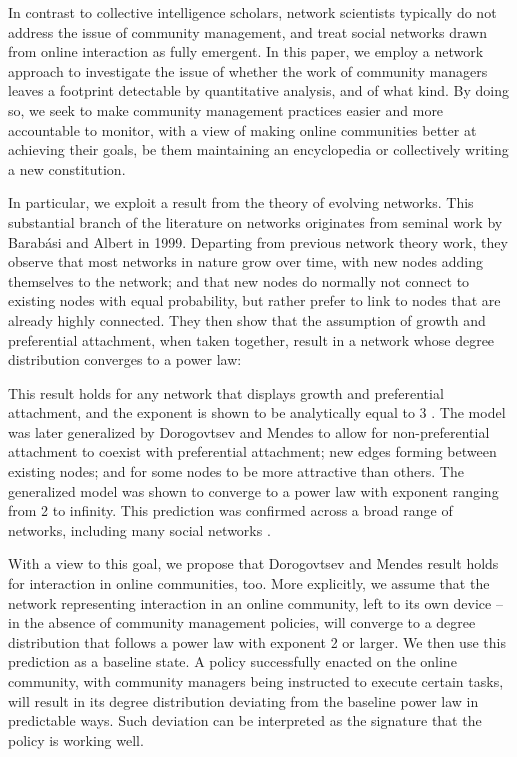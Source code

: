 In contrast to collective intelligence scholars, network scientists typically do not address the issue of community management, and treat social networks drawn from online interaction as fully emergent. In this paper, we employ a network approach to investigate the issue of whether the work of community managers leaves a footprint detectable by quantitative analysis, and of what kind. By doing so, we seek to make community management practices easier and more accountable to monitor, with a view of making online communities better at achieving their goals, be them maintaining an encyclopedia or collectively writing a new constitution. 

In particular, we exploit a result from the theory of evolving networks. This substantial branch of the literature on networks originates from seminal work by Barabási and Albert \cite{barabasi1999emergence} in 1999. Departing from previous network theory work, they observe that most networks in nature grow over time, with new nodes adding themselves to the network; and that new nodes do normally not connect to existing nodes with equal probability, but rather prefer to link to nodes that are already highly connected. They then show that the assumption of growth and preferential attachment, when taken together, result in a network whose degree distribution converges to a power law: 

This result holds for any network that displays growth and preferential attachment, and the exponent is shown to be analytically equal to 3 \cite{barabasi2005origin, barabasi1999mean}.  The model was later generalized by Dorogovtsev and Mendes to allow for non-preferential attachment to coexist with preferential attachment; new edges forming between existing nodes; and for some nodes to be more attractive than others. The generalized model was shown to converge to a power law with exponent ranging from 2 to infinity. This prediction was confirmed across a broad range of networks, including many social networks \cite{dorogovtsev2002evolution}.

With a view to this goal, we propose that Dorogovtsev and Mendes result \cite{dorogovtsev2002evolution} holds for interaction in online communities, too. More explicitly, we assume that the network representing interaction in an online community, left to its own device – in the absence of community management policies, will converge to a degree distribution that follows a power law with exponent 2 or larger. We then use this prediction as a baseline state. A policy successfully enacted on the online community, with community managers being instructed to execute certain tasks, will result in its degree distribution deviating from the baseline power law in predictable ways. Such deviation can be interpreted as the signature that the policy is working well. 

